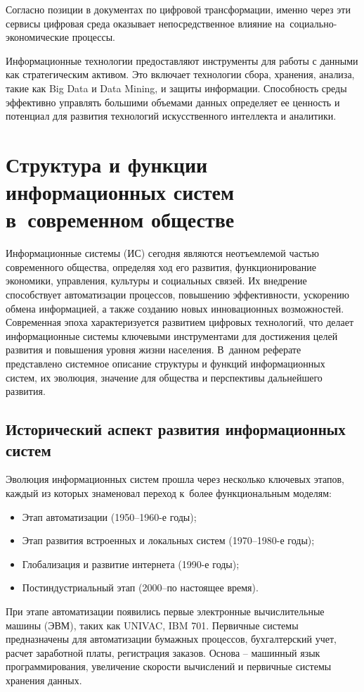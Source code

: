 \documentclass{ou}
\begin{document}
Согласно позиции в документах по цифровой трансформации, именно через эти сервисы цифровая среда оказывает непосредственное влияние на~социально-экономические процессы.

Информационные технологии предоставляют инструменты для работы с данными как стратегическим активом. Это включает технологии сбора, хранения, анализа, такие как Big Data и Data Mining, и защиты информации. Способность среды эффективно управлять большими объемами данных определяет ее ценность и потенциал для развития технологий искусственного интеллекта и аналитики\cite{Portal.tpu}.
\newpage
\section{Структура и функции информационных систем в~современном обществе}
Информационные системы (ИС) сегодня являются неотъемлемой частью современного общества, определяя ход его развития, функционирование экономики, управления, культуры и социальных связей. Их внедрение способствует автоматизации процессов, повышению эффективности, ускорению обмена информацией, а также созданию новых инновационных возможностей. Современная эпоха характеризуется развитием цифровых технологий, что делает информационные системы ключевыми инструментами для достижения целей развития и повышения уровня жизни населения. В~данном реферате представлено системное описание структуры и функций информационных систем, их эволюция, значение для общества и перспективы дальнейшего развития.
\subsection{Исторический аспект развития информационных систем}
Эволюция информационных систем прошла через несколько ключевых этапов, каждый из которых знаменовал переход к~более функциональным моделям:
\begin{itemize}[label=-, leftmargin=0em, itemindent=3.35em, nosep]
\item Этап автоматизации (1950–1960-е годы);
\item Этап развития встроенных и локальных систем (1970–1980-е годы);
\item Глобализация и развитие интернета (1990-е годы);
\item Постиндустриальный этап (2000–по настоящее время).
\end{itemize}
При этапе автоматизации появились первые электронные вычислительные машины (ЭВМ), таких как UNIVAC, IBM 701. Первичные системы предназначены для автоматизации бумажных процессов, бухгалтерский учет, расчет заработной платы, регистрация заказов.
Основа -- машинный язык программирования, увеличение скорости вычислений и первичные системы хранения данных.
\end{document}
